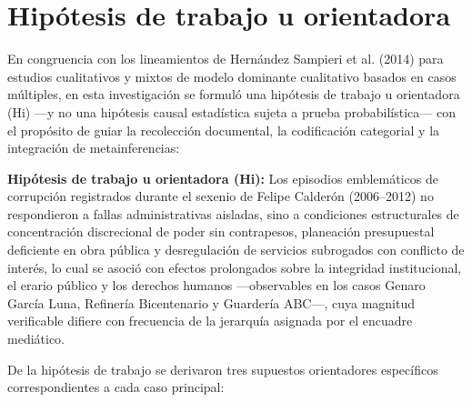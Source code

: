 

\section{Hipótesis de trabajo u orientadora}

En congruencia con los lineamientos de Hernández Sampieri et al. (2014) para estudios cualitativos y mixtos de modelo dominante cualitativo basados en casos múltiples, en esta investigación se formuló una hipótesis de trabajo u orientadora (Hi) ---y no una hipótesis causal estadística sujeta a prueba probabilística--- con el propósito de guiar la recolección documental, la codificación categorial y la integración de metainferencias:

\textbf{Hipótesis de trabajo u orientadora (Hi):} Los episodios emblemáticos de corrupción registrados durante el sexenio de Felipe Calderón (2006--2012) no respondieron a fallas administrativas aisladas, sino a condiciones estructurales de concentración discrecional de poder sin contrapesos, planeación presupuestal deficiente en obra pública y desregulación de servicios subrogados con conflicto de interés, lo cual se asoció con efectos prolongados sobre la integridad institucional, el erario público y los derechos humanos ---observables en los casos Genaro García Luna, Refinería Bicentenario y Guardería ABC---, cuya magnitud verificable difiere con frecuencia de la jerarquía asignada por el encuadre mediático.

De la hipótesis de trabajo se derivaron tres supuestos orientadores específicos correspondientes a cada caso principal:

